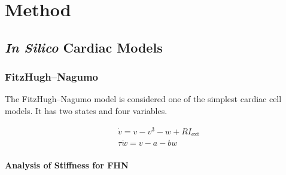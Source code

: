 \chapter{Method}
\label{sec:method}


\section{\textit{In Silico} Cardiac Models}




\subsection{FitzHugh–Nagumo}

The FitzHugh–Nagumo model is considered one of the simplest cardiac %
cell models. It has two states and four variables.

\begin{align}\label{eq:fhn} %
	&\dot{v}=v-v^{3}-w+R I_{\mathrm{ext}} \\
	&\tau \dot{w}=v-a-b w
\end{align}



\subsubsection{Analysis of Stiffness for FHN}


